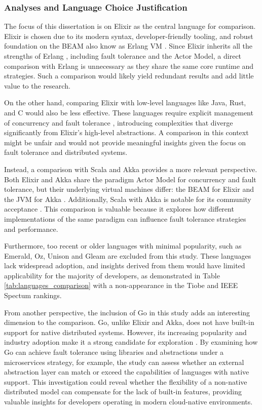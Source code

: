 \subsubsection{Analyses and Language Choice Justification}

The focus of this dissertation is on Elixir as the central language for comparison. Elixir is chosen due to its modern syntax, developer-friendly tooling, and robust foundation on the \gls{BEAM} also know as Erlang \gls{VM} \cite{Juric2024}. Since Elixir inherits all the strengths of Erlang \cite{Valkov2018}, including fault tolerance and the Actor Model, a direct comparison with Erlang is unnecessary as they share the same core runtime and strategies. Such a comparison would likely yield redundant results and add little value to the research.

On the other hand, comparing Elixir with low-level languages like Java, Rust, and C would also be less effective. These languages require explicit management of concurrency and fault tolerance \cite{Valkov2018}, introducing complexities that diverge significantly from Elixir's high-level abstractions. A comparison in this context might be unfair and would not provide meaningful insights given the focus on fault tolerance and distributed systems.

Instead, a comparison with Scala and Akka provides a more relevant perspective. Both Elixir and Akka share the paradigm Actor Model for concurrency and fault tolerance, but their underlying virtual machines differ: the BEAM for Elixir and the \gls{JVM} for Akka \cite{Abraham2023}. Additionally, Scala with Akka is notable for its community acceptance \cite{Valkov2018}. This comparison is valuable because it explores how different implementations of the same paradigm can influence fault tolerance strategies and performance.

Furthermore, too recent or older languages with minimal popularity, such as Emerald, Oz, Unison and Gleam are excluded from this study. These languages lack widespread adoption, and insights derived from them would have limited applicability for the majority of developers, as demonstrated in Table \ref{tab:languages_comparison} with a non-appearance in the Tiobe and IEEE Spectum rankings.

From another perspective, the inclusion of Go in this study adds an interesting dimension to the comparison. Go, unlike Elixir and Akka, does not have built-in support for native distributed systems. However, its increasing popularity and industry adoption make it a strong candidate for exploration \cite{Brolos2021}. By examining how Go can achieve fault tolerance using libraries and abstractions under a microservices strategy, for example, the study can assess whether an external abstraction layer can match or exceed the capabilities of languages with native support. This investigation could reveal whether the flexibility of a non-native distributed model can compensate for the lack of built-in features, providing valuable insights for developers operating in modern cloud-native environments.

